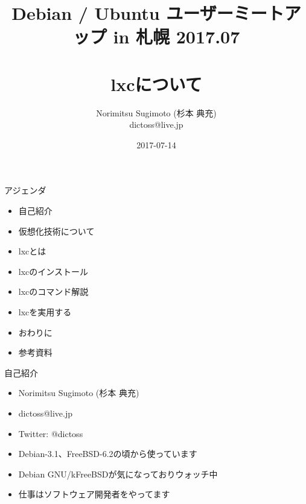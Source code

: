 \title{Debian / Ubuntu ユーザーミートアップ in 札幌 2017.07 \\　\\lxcについて}
\subtitle{}
\author{Norimitsu Sugimoto (杉本 典充) \\dictoss@live.jp}
\date{2017-07-14}



\frame{\titlepage{}}


\begin{frame}{アジェンダ}
  \begin{itemize}
  \item 自己紹介
  \item 仮想化技術について
  \item lxcとは
  \item lxcのインストール
  \item lxcのコマンド解説
  \item lxcを実用する
  \item おわりに
  \item 参考資料
  \end{itemize}
\end{frame}


\begin{frame}{自己紹介}
  \begin{itemize}
  \item Norimitsu Sugimoto (杉本 典充)
  \item dictoss@live.jp
  \item Twitter: @dictoss
  \item Debian-3.1、FreeBSD-6.2の頃から使っています
  \item Debian GNU/kFreeBSDが気になっておりウォッチ中
  \item 仕事はソフトウェア開発者をやってます
  \end{itemize}
\end{frame}


